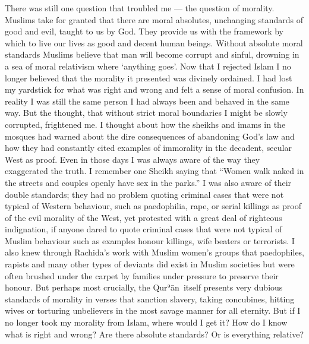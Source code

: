 \documentclass[12pt]{memoir}
\def\´{ʾ} %
\newcommand{\cor}[2]{#2} %
\def \Quran{Qur\-\´ān} %
\begin{document}
There was still one question that troubled me — the question of morality.
Muslims take for granted that there are moral absolutes,
unchanging standards of good and evil, taught to us by God.
They provide us with the framework by which to live our lives
as good and decent human beings.
Without absolute moral standards Muslims believe
that man will become corrupt and sinful,
drowning in a sea of moral relativism where ‘anything goes’.
Now that I rejected Islam I no longer believed
that the morality it presented was divinely ordained.
I had lost my yardstick for what was right and wrong
and felt a sense of moral confusion.
In reality I was still the same person I had always been
and behaved in the same way.
But the thought, that without strict moral boundaries
I might be slowly corrupted, frightened me.
I thought about how the sheikhs and \cor{Imams}{imams} in the mosques
had warned about the dire consequences of abandoning God’s law
and how they had constantly cited examples of immorality
in the decadent, secular West as proof.
Even in those days I was always aware of the way they exaggerated the truth.
I remember one Sheikh saying that
“Women walk naked in the streets and couples openly have sex in the parks.”
I was also aware of their double standards;
they had no problem quoting criminal cases that were not typical
of Western behaviour, such as paedophilia, rape, or serial killings
as proof of the evil morality of the West,
yet protested with a great deal of righteous indignation,
if anyone dared to quote criminal cases that were not typical
of Muslim behaviour such as examples honour killings,
wife beaters or terrorists.
I also knew through Rachida’s work with Muslim women’s groups
that paedophiles, rapists and many other types of deviants
did exist in Muslim societies but were often brushed under the carpet
by families under pressure to preserve their honour.
But perhaps most crucially, the \Quran\ itself presents
very dubious standards of morality in verses that sanction slavery,
taking concubines, hitting wives or torturing unbelievers
in the most savage manner for all eternity.
But if I no longer took my morality from Islam, where would I get it?
How do I know what is right and wrong?
Are there absolute standards?
Or is everything relative?
\end{document}
